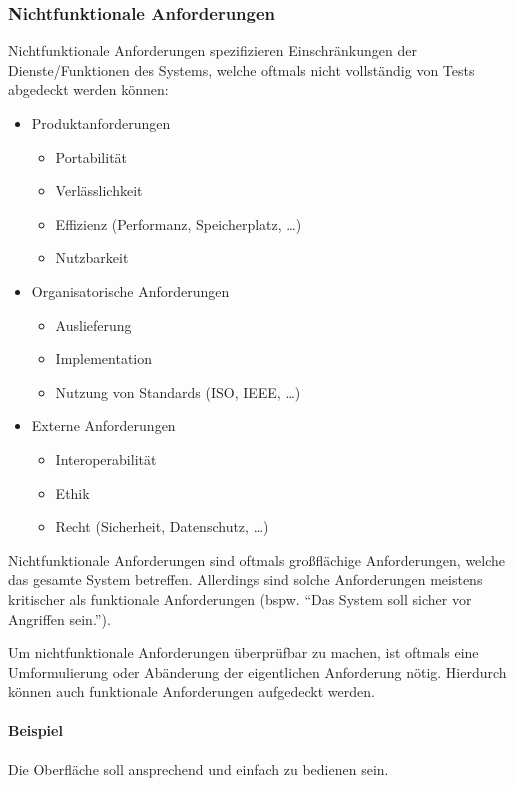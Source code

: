 \documentclass[a4paper, 11pt, accentcolor = tud3b]{tudreport}
\begin{document}
				\subsubsection{Nichtfunktionale Anforderungen}
					Nichtfunktionale Anforderungen spezifizieren Einschränkungen der Dienste/Funktionen des Systems, welche oftmals nicht vollständig von Tests abgedeckt werden können:
					\begin{itemize}
						\item Produktanforderungen
							\begin{itemize}
								\item Portabilität
								\item Verlässlichkeit
								\item Effizienz (Performanz, Speicherplatz, \dots)
								\item Nutzbarkeit
							\end{itemize}
						\item Organisatorische Anforderungen
							\begin{itemize}
								\item Auslieferung
								\item Implementation
								\item Nutzung von Standards (ISO, IEEE, \dots)
							\end{itemize}
						\item Externe Anforderungen
							\begin{itemize}
								\item Interoperabilität
								\item Ethik
								\item Recht (Sicherheit, Datenschutz, \dots)
							\end{itemize}
					\end{itemize}
					
					Nichtfunktionale Anforderungen sind oftmals großflächige Anforderungen, welche das gesamte System betreffen. Allerdings sind solche Anforderungen meistens kritischer als funktionale Anforderungen (bspw. \enquote{Das System soll sicher vor Angriffen sein.}).
					
					Um nichtfunktionale Anforderungen überprüfbar zu machen, ist oftmals eine Umformulierung oder Abänderung der eigentlichen Anforderung nötig. Hierdurch können auch funktionale Anforderungen aufgedeckt werden.
					
					\paragraph{Beispiel}
						Die Oberfläche soll ansprechend und einfach zu bedienen sein.
		
\end{document}
